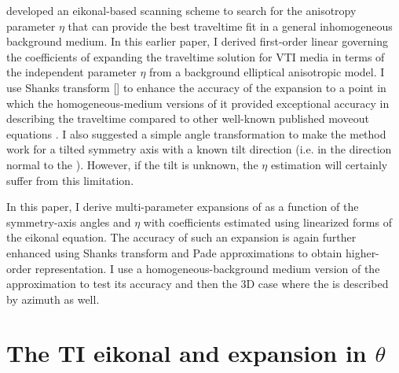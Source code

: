  \cite{etascan} developed an eikonal-based scanning scheme to search
 for the anisotropy parameter $\eta$ that can provide the best
 traveltime fit  in a general inhomogeneous background medium. In this earlier paper, I derived first-order
 linear  governing the coefficients of expanding the traveltime
 solution for VTI media in terms of the independent parameter $\eta$
 from a background elliptical anisotropic model. I use  Shanks transform [\cite{Bender}] to enhance the accuracy of the expansion to a point in
 which the homogeneous-medium versions of it provided exceptional accuracy in describing the traveltime compared to other well-known published
 moveout equations \cite[]{GEO65-04-13161325}. 
I also suggested a simple angle transformation to make the method work for a tilted symmetry axis with a known tilt
 direction (i.e. in the direction normal to the ). However, if the tilt  is unknown, the $\eta$ estimation will certainly suffer from this limitation.

In this paper, I derive multi-parameter expansions of  
as a function of the symmetry-axis  angles and $\eta$ with coefficients estimated using
linearized forms of the eikonal equation. The accuracy of such an expansion is again further enhanced using Shanks transform and Pade
approximations to obtain  higher-order representation. I use a homogeneous-background medium version of the approximation to test its
accuracy and then   the 3D case where the   is described by
azimuth as well.

\section{The TI eikonal and expansion in $\theta$}


